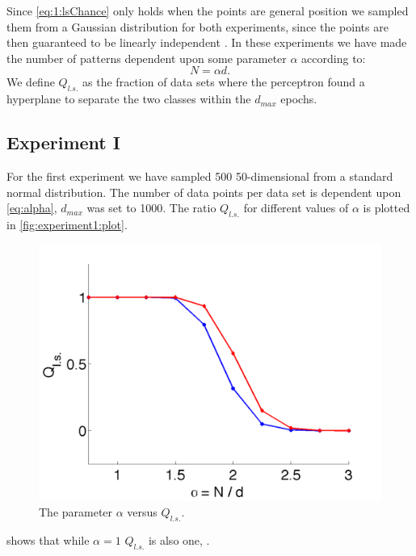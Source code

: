 Since \autoref{eq:1:lsChance} only holds when the points are general position we sampled them from a Gaussian distribution for both experiments, since the points are then guaranteed to be linearly independent \cite[Chapter~5]{prince2012computer}. In these experiments we have made the number of patterns dependent upon some parameter $\alpha$ according to: 
	\begin{equation}\label{eq:alpha}
		N = \alpha d.
	\end{equation}
We define $Q_{l.s.}$ as the fraction of data sets where the perceptron found a hyperplane to separate the two classes within the $d_{max}$ epochs.	

\subsection*{Experiment I}\label{ssec:experimentI}
For the first experiment we have sampled 500 50-dimensional from a standard normal distribution. The number of data points per data set is dependent upon \eqref{eq:alpha}, $d_{max}$ was set to 1000. The ratio $Q_{l.s.}$ for different values of $\alpha$ is plotted in \autoref{fig:experiment1:plot}.

\begin{figure}[H]
	\centering
	\includegraphics[width=\columnwidth]{./img/Aa_N50_nd500_nmax1000}
	\caption{The parameter $\alpha$ versus $Q_{l.s.}$.}
	\label{fig:experiment1:plot}
\end{figure}

 shows that while $\alpha = 1$ $Q_{l.s.}$ is also one, . 

